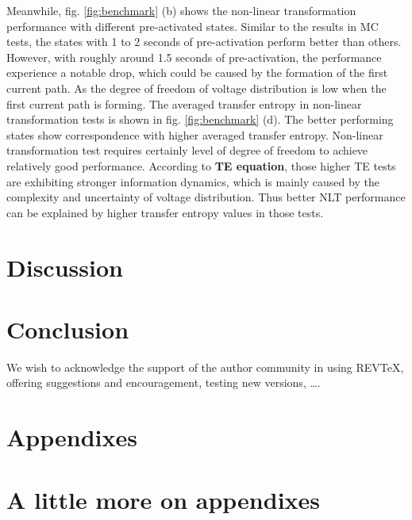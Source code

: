 \documentclass[%
 reprint,
 amsmath,amssymb,
 aps,
floatfix,
]{revtex4-2}
\begin{document}
Meanwhile, fig. \ref{fig:benchmark} (b) shows the non-linear transformation performance with different pre-activated states. Similar to the results in MC tests, the states with 1 to 2 seconds of pre-activation perform better than others. However, with roughly around 1.5 seconds of pre-activation, the performance experience a notable drop, which could be caused by the formation of the first current path. As the degree of freedom of voltage distribution is low when the first current path is forming. The averaged transfer entropy in non-linear transformation tests is shown in fig. \ref{fig:benchmark} (d). The better performing states show correspondence with higher averaged transfer entropy. Non-linear transformation test requires certainly level of degree of freedom to achieve relatively good performance. According to \textbf{TE equation}, those higher TE tests are exhibiting stronger information dynamics, which is mainly caused by the complexity and uncertainty of voltage distribution. Thus better NLT performance can be explained by higher transfer entropy values in those tests.

\clearpage
\section{\label{sec:level1} Discussion}

\section{\label{sec:level1} Conclusion}








\begin{acknowledgments}
We wish to acknowledge the support of the author community in using
REV\TeX{}, offering suggestions and encouragement, testing new versions,
\dots.
\end{acknowledgments}

\appendix

\section{Appendixes}



\section{A little more on appendixes}



\nocite{*}



 \label{paper1}%
\end{document}
